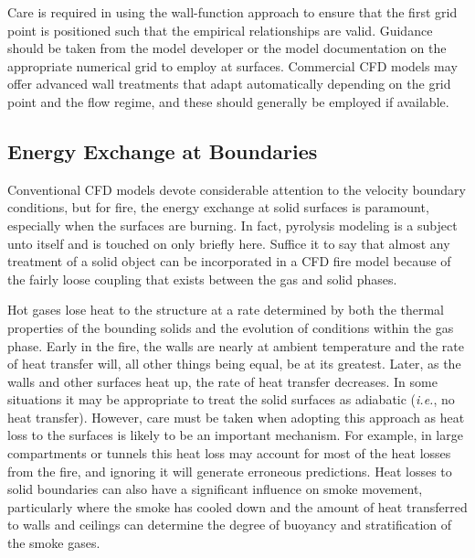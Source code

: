 \documentclass[graybox]{svmult}
\begin{document}
Care is required in using the wall-function approach to ensure that the first grid point is positioned such that the empirical relationships are valid. Guidance should be taken from the model developer or the model documentation on the appropriate numerical grid to employ at surfaces. Commercial CFD models may offer advanced wall treatments that adapt automatically depending on the grid point and the flow regime, and these should generally be employed if available.

\subsection{Energy Exchange at Boundaries}

Conventional CFD models devote considerable attention to the velocity boundary conditions, but for fire, the energy exchange at solid surfaces is paramount, especially when the surfaces are burning. In fact, pyrolysis modeling is a subject unto itself and is touched on only briefly here. Suffice it to say that almost any treatment of a solid object can be incorporated in a CFD fire model because of the fairly loose coupling that exists between the gas and solid phases.

Hot gases lose heat to the structure at a rate determined by both the thermal properties of the bounding solids and the evolution of conditions within the gas phase. Early in the fire, the walls are nearly at ambient temperature and the rate of heat transfer will, all other things being equal, be at its greatest. Later, as the walls and other surfaces heat up, the rate of heat transfer decreases. In some situations it may be appropriate to treat the solid surfaces as adiabatic ({\em i.e.}, no heat transfer). However, care must be taken when adopting this approach as heat loss to the surfaces is likely to be an important mechanism. For example, in large compartments or tunnels this heat loss may account for most of the heat losses from the fire, and ignoring it will generate erroneous predictions. Heat losses to solid boundaries can also have a significant influence on smoke movement, particularly where the smoke has cooled down and the amount of heat transferred to walls and ceilings can determine the degree of buoyancy and stratification of the smoke gases.
\end{document}
